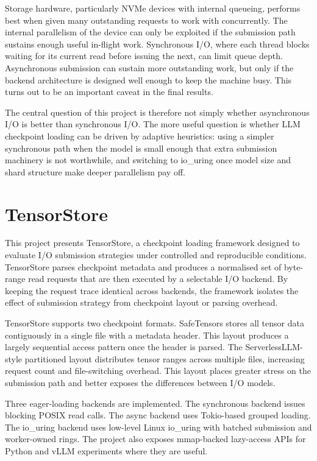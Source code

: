 Storage hardware, particularly NVMe devices with internal queueing, performs best when given many outstanding requests to work with concurrently. The internal parallelism of the device can only be exploited if the submission path sustains enough useful in-flight work. Synchronous I/O, where each thread blocks waiting for its current read before issuing the next, can limit queue depth. Asynchronous submission can sustain more outstanding work, but only if the backend architecture is designed well enough to keep the machine busy. This turns out to be an important caveat in the final results.

The central question of this project is therefore not simply whether asynchronous I/O is better than synchronous I/O. The more useful question is whether LLM checkpoint loading can be driven by adaptive heuristics: using a simpler synchronous path when the model is small enough that extra submission machinery is not worthwhile, and switching to io\_uring once model size and shard structure make deeper parallelism pay off.

\section{TensorStore}

This project presents TensorStore, a checkpoint loading framework designed to evaluate I/O submission strategies under controlled and reproducible conditions. TensorStore parses checkpoint metadata and produces a normalised set of byte-range read requests that are then executed by a selectable I/O backend. By keeping the request trace identical across backends, the framework isolates the effect of submission strategy from checkpoint layout or parsing overhead.

TensorStore supports two checkpoint formats. SafeTensors stores all tensor data contiguously in a single file with a metadata header. This layout produces a largely sequential access pattern once the header is parsed. The ServerlessLLM-style partitioned layout distributes tensor ranges across multiple files, increasing request count and file-switching overhead. This layout places greater stress on the submission path and better exposes the differences between I/O models.

Three eager-loading backends are implemented. The synchronous backend issues blocking POSIX read calls. The async backend uses Tokio-based grouped loading. The io\_uring backend uses low-level Linux io\_uring with batched submission and worker-owned rings. The project also exposes mmap-backed lazy-access APIs for Python and vLLM experiments where they are useful.

